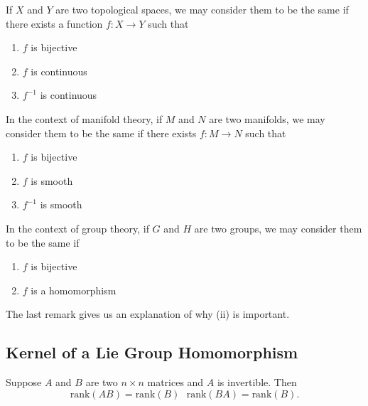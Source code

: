 \begin{remark}[Topology]
   If \( X  \) and \( Y  \) are two topological spaces, we may consider them to be the same if there exists a function \( f : X \to Y  \) such that   
   \begin{enumerate}
           \item[(1)] \( f  \) is bijective 
            \item[(2)] \( f  \) is continuous
        \item[(3)] \( f^{-1} \) is continuous
   \end{enumerate}

   In the context of manifold theory, if \( M  \) and \( N  \) are two manifolds, we may consider them to be the same if there exists \( f : M \to N  \) such that 
   \begin{enumerate}
       \item[(1)]\( f  \) is bijective
       \item[(2)] \( f  \) is smooth 
       \item[(3)] \( f^{-1} \) is smooth 
   \end{enumerate}

   In the context of group theory, if \( G  \) and \( H  \) are two groups, we may consider them to be the same if 
   \begin{enumerate}
       \item[(1)] \( f  \) is bijective
        \item[(2)] \( f  \) is a homomorphism
   \end{enumerate}
   The last remark gives us an explanation of why (ii) is important.
\end{remark}

\subsection{Kernel of a Lie Group Homomorphism}

\begin{remark}\label{Fact from Linear Algebra}
    Suppose \( A  \) and \( B  \) are two \( n \times n  \) matrices and \( A  \) is invertible. Then 
\[  \text{rank}(AB) = \text{rank}(B) \ \ \ \text{rank}(BA) = \text{rank}(B). \]
\end{remark}

